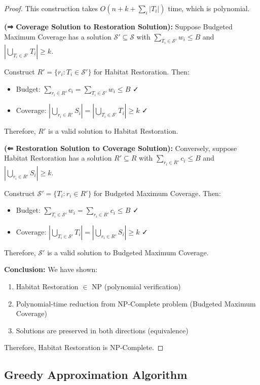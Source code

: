 \documentclass[sigconf,nonacm]{acmart}
\begin{document}
\begin{proof}
This construction takes $O(n + k + \sum_i |T_i|)$ time, which is polynomial.

\textbf{(⇒ Coverage Solution to Restoration Solution):} Suppose Budgeted Maximum Coverage has a solution $\mathcal{S}' \subseteq \mathcal{S}$ with $\sum_{T_i \in \mathcal{S}'} w_i \leq B$ and $|\bigcup_{T_i \in \mathcal{S}'} T_i| \geq k$.

Construct $R' = \{r_i : T_i \in \mathcal{S}'\}$ for Habitat Restoration. Then:
\begin{itemize}
    \item Budget: $\sum_{r_i \in R'} c_i = \sum_{T_i \in \mathcal{S}'} w_i \leq B$ ✓
    \item Coverage: $|\bigcup_{r_i \in R'} S_i| = |\bigcup_{T_i \in \mathcal{S}'} T_i| \geq k$ ✓
\end{itemize}

Therefore, $R'$ is a valid solution to Habitat Restoration.

\textbf{(⇐ Restoration Solution to Coverage Solution):} Conversely, suppose Habitat Restoration has a solution $R' \subseteq R$ with $\sum_{r_i \in R'} c_i \leq B$ and $|\bigcup_{r_i \in R'} S_i| \geq k$.

Construct $\mathcal{S}' = \{T_i : r_i \in R'\}$ for Budgeted Maximum Coverage. Then:
\begin{itemize}
    \item Budget: $\sum_{T_i \in \mathcal{S}'} w_i = \sum_{r_i \in R'} c_i \leq B$ ✓
    \item Coverage: $|\bigcup_{T_i \in \mathcal{S}'} T_i| = |\bigcup_{r_i \in R'} S_i| \geq k$ ✓
\end{itemize}

Therefore, $\mathcal{S}'$ is a valid solution to Budgeted Maximum Coverage.

\textbf{Conclusion:} We have shown:
\begin{enumerate}
    \item Habitat Restoration $\in$ NP (polynomial verification)
    \item Polynomial-time reduction from NP-Complete problem (Budgeted Maximum Coverage)
    \item Solutions are preserved in both directions (equivalence)
\end{enumerate}

Therefore, Habitat Restoration is NP-Complete.
\end{proof}

\subsection{Greedy Approximation Algorithm}
\end{document}

